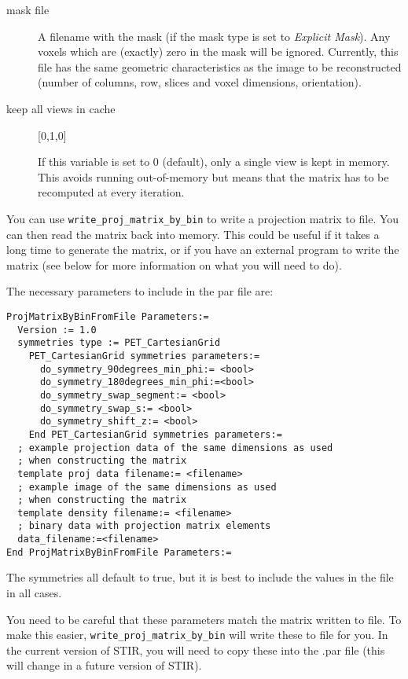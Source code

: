 \documentclass{article}
\begin{document}
\begin{description}
\item[mask file]

 A filename with the mask (if the mask type is set to \textit{Explicit Mask}). Any voxels which are 
 (exactly) zero in the mask will be ignored.
 Currently, this file has the same geometric characteristics as the image to be
  reconstructed (number of columns, row, slices and voxel dimensions, orientation).

\item[keep all views in cache] [0,1,0{]}

  If this variable is set to 0 (default), only a single view is kept in memory. This avoids running
  out-of-memory but means that the matrix has to be recomputed at every iteration.

\end{description}

{  }
\label{sec:projmatrixfromfile}

You can use \texttt{write\_proj\_matrix\_by\_bin} to write a projection matrix to file. You can
then read the matrix back into memory. This
could be useful if it takes a long time to generate the matrix, or if you have an external program
to write the matrix (see below for more information on what you will need to do).


{ 
}

The necessary parameters to include in the par file are:
\begin{verbatim}
ProjMatrixByBinFromFile Parameters:=
  Version := 1.0
  symmetries type := PET_CartesianGrid
    PET_CartesianGrid symmetries parameters:=
      do_symmetry_90degrees_min_phi:= <bool>
      do_symmetry_180degrees_min_phi:=<bool>
      do_symmetry_swap_segment:= <bool>
      do_symmetry_swap_s:= <bool>
      do_symmetry_shift_z:= <bool>
    End PET_CartesianGrid symmetries parameters:=
  ; example projection data of the same dimensions as used 
  ; when constructing the matrix
  template proj data filename:= <filename>
  ; example image of the same dimensions as used 
  ; when constructing the matrix
  template density filename:= <filename>
  ; binary data with projection matrix elements
  data_filename:=<filename> 
End ProjMatrixByBinFromFile Parameters:=
\end{verbatim}
The symmetries all default to true, but it is best to include the values in the file in all cases. 

You need to be careful that these parameters match the matrix written to file. To make this easier,
\texttt{write\_proj\_matrix\_by\_bin} will write these to file for you. In the current version
of STIR, you will need to copy these into the .par file (this will change in a future version of STIR).
\end{document}
